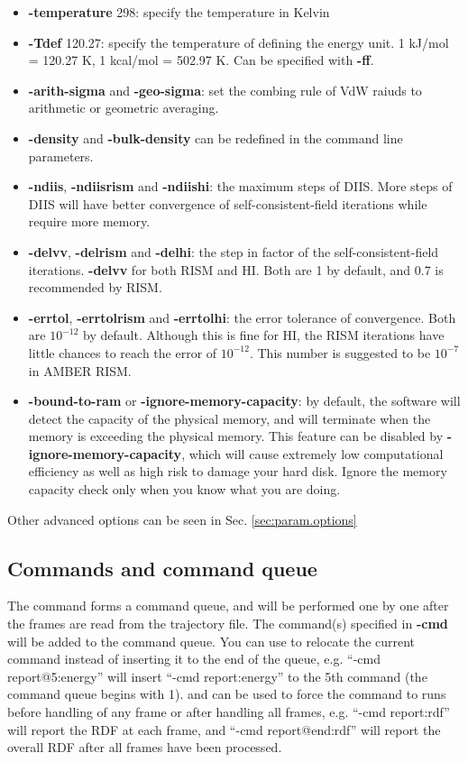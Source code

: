 \documentclass[aip,amsmath,amssymb,reprint,onecolumn]{revtex4-1}
\begin{document}
\begin{itemize}
    \item {\bf -temperature} 298: specify the temperature in Kelvin
    \item {\bf -Tdef} 120.27: specify the temperature of defining the energy unit. 1 kJ/mol = 120.27 K, 1 kcal/mol = 502.97 K. Can be specified with {\bf -ff}.
    \item {\bf -arith-sigma} and {\bf -geo-sigma}: set the combing rule of VdW raiuds to arithmetic or geometric averaging.
    \item {\bf -density} and {\bf -bulk-density} can be redefined in the command line parameters.
    \item {\bf -ndiis}, {\bf -ndiisrism} and {\bf -ndiishi}: the maximum steps of DIIS. More steps of DIIS will have better convergence of self-consistent-field iterations while require more memory.
    \item {\bf -delvv}, {\bf -delrism} and {\bf -delhi}: the step in factor of the self-consistent-field iterations. {\bf -delvv} for both RISM and HI. Both are 1 by default, and 0.7 is recommended by RISM.
    \item {\bf -errtol}, {\bf -errtolrism} and {\bf -errtolhi}: the error tolerance of convergence. Both are $10^{-12}$ by default. Although this is fine for HI, the RISM iterations have little chances to reach the error of $10^{-12}$. This number is suggested to be $10^{-7}$ in AMBER RISM.
    \item {\bf -bound-to-ram} or {\bf -ignore-memory-capacity}: by default, the software will detect the capacity of the physical memory, and will terminate when the memory is exceeding the physical memory. This feature can be disabled by {\bf -ignore-memory-capacity}, which will cause extremely low computational efficiency as well as high risk to damage your hard disk. Ignore the memory capacity check only when you know what you are doing.
\end{itemize}

Other advanced options can be seen in Sec. \ref{sec:param.options}

\subsection{Commands and command queue}\label{sec:param.command}

The command forms a command queue, and will be performed one by one after the frames are read from the trajectory file. The command(s) specified in {\bf -cmd} will be added to the command queue. You can use \@ to relocate the current command instead of inserting it to the end of the queue, e.g. ``-cmd report@5:energy'' will insert ``-cmd report:energy'' to the 5th command (the command queue begins with 1). \@b and \@e can be used to force the command to runs before handling of any frame or after handling all frames, e.g. ``-cmd report:rdf'' will report the RDF at each frame, and ``-cmd report@end:rdf'' will report the overall RDF after all frames have been processed.
\end{document}

